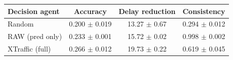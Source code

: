\begin{tabular}{lccc}
\toprule
Decision agent & Accuracy & Delay reduction & Consistency \\
\midrule
Random & 0.200 $\pm$ 0.019 & 13.27 $\pm$ 0.67 & 0.294 $\pm$ 0.012 \\
RAW (pred only) & 0.233 $\pm$ 0.001 & 15.72 $\pm$ 0.02 & 0.998 $\pm$ 0.002 \\
XTraffic (full) & 0.266 $\pm$ 0.012 & 19.73 $\pm$ 0.22 & 0.619 $\pm$ 0.045 \\
\bottomrule
\end{tabular}
